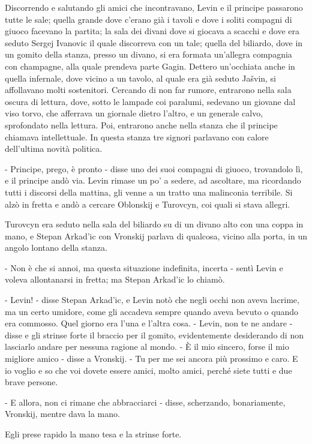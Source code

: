 Discorrendo e salutando gli amici che incontravano, Levin e il principe passarono tutte le sale; quella grande dove c'erano già i tavoli e dove i soliti compagni di giuoco facevano la partita; la sala dei divani dove si giocava a scacchi e dove era seduto Sergej Ivanovic il quale discorreva con un tale; quella del biliardo, dove in un gomito della stanza, presso un divano, si era formata un'allegra compagnia con champagne, alla quale prendeva parte Gagin. Dettero un'occhiata anche in quella infernale, dove vicino a un tavolo, al quale era già seduto Jašvin, si affollavano molti sostenitori. Cercando di non far rumore, entrarono nella sala oscura di lettura, dove, sotto le lampade coi paralumi, sedevano un giovane dal viso torvo, che afferrava un giornale dietro l'altro, e un generale calvo, sprofondato nella lettura. Poi, entrarono anche nella stanza che il principe chiamava intellettuale. In questa stanza tre signori parlavano con calore dell'ultima novità politica. 

- Principe, prego, è pronto - disse uno dei suoi compagni di giuoco, trovandolo lì, e il principe andò via. Levin rimase un po' a sedere, ad ascoltare, ma ricordando tutti i discorsi della mattina, gli venne a un tratto una malinconia terribile. Si alzò in fretta e andò a cercare Oblonskij e Turovcyn, coi quali si stava allegri. 

Turovcyn era seduto nella sala del biliardo su di un divano alto con una coppa in mano, e Stepan Arkad'ic con Vronskij parlava di qualcosa, vicino alla porta, in un angolo lontano della stanza. 

- Non è che si annoi, ma questa situazione indefinita, incerta - sentì Levin e voleva allontanarsi in fretta; ma Stepan Arkad'ic lo chiamò. 

- Levin! - disse Stepan Arkad'ic, e Levin notò che negli occhi non aveva lacrime, ma un certo umidore, come gli accadeva sempre quando aveva bevuto o quando era commosso. Quel giorno era l'una e l'altra cosa. - Levin, non te ne andare - disse e gli strinse forte il braccio per il gomito, evidentemente desiderando di non lasciarlo andare per nessuna ragione al mondo. - È il mio sincero, forse il mio migliore amico - disse a Vronskij. - Tu per me sei ancora più prossimo e caro. E io voglio e so che voi dovete essere amici, molto amici, perché siete tutti e due brave persone. 

- E allora, non ci rimane che abbracciarci - disse, scherzando, bonariamente, Vronskij, mentre dava la mano. 

Egli prese rapido la mano tesa e la strinse forte. 

